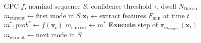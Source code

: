 \begin{algorithm}
\caption{Confidence-Gated Mode Supervision}\label{alg:supervision}
\begin{algorithmic}[1]
\Require GPC $f$, nominal sequence $S$, confidence threshold $\tau$, dwell $N_{\text{thresh}}$
\State $m_{\text{current}}\gets\text{first mode in }S$
\State $\mathbf{x}_t\gets\text{extract features }F_{\min}\text{ at time }t$
\State $m^*, prob^*\gets f(\mathbf{x}_t)$ 
    \State $m_{\text{current}}\gets m^*$ 
\EndIf
\State \textbf{Execute} step of $\pi_{m_{\text{current}}}(\mathbf{x}_t)$
    \State $m_{\text{current}}\gets\text{next mode in }S$ 
\EndIf
\EndWhile
\end{algorithmic}
\end{algorithm}

